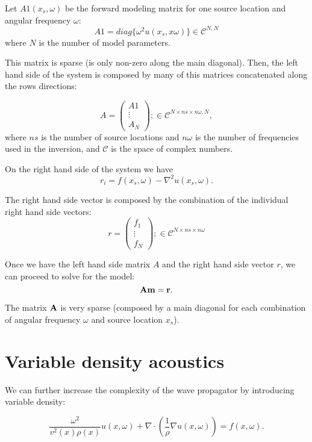 \documentclass[10pt]{article}
\begin{document}
Let $A1(x_s,\omega)$ be the forward
 modeling matrix for one source location and angular frequency $\omega$:
\[
  A1 = diag\{\omega^2 u(x_s,x\omega)\} \in \mathcal{C}^{N,N} 
\]
where $N$ is the number of model parameters.

This matrix is sparse (is only non-zero along the main diagonal).
Then, the left hand side of the system is composed by many of this 
matrices concatenated along the rows directions:

\[
 A = 
 \begin{pmatrix}
  A1     \\
  \vdots  \\
  A_N    
 \end{pmatrix};
\in \mathcal{C}^{N\times ns \times n\omega,N},
\]
where $ns$ is the number of source locations and $n\omega$ is the number
of frequencies used in the inversion, and $\mathcal{C}$ is the space of complex numbers.

On the right hand side of the system we have 
\[
 r_i = f(x_s,\omega) -\nabla^2 u(x_s,\omega).
\]

The right hand side vector is composed by the combination of the individual
right hand side vectors:
\[
 r = 
 \begin{pmatrix}
  f_1     \\
  \vdots  \\
  f_N    
 \end{pmatrix};
\in \mathcal{C}^{N\times ns \times n\omega}
\]

Once we have the left hand side matrix $A$ and the right hand side vector $r$, 
we can proceed to solve for the model:
\begin{equation}
 {\bf A }{\bf m} = \bf r.
\label{eq:linear1}
\end{equation}


The matrix $\bf A$ is very sparse (composed by a main diagonal  for each combination
of angular frequency $\omega$ and source location $x_s$).


\section{Variable density acoustics}

We can further increase the complexity of the wave propagator by introducing variable density: 

\begin{equation}
  \frac{\omega^2 }{v^2(x) \rho(x)} u(x,\omega) +\nabla \cdot(\frac{1}{\rho} \nabla u(x,\omega)) = f(x,\omega).
  \label{eq:vden}
\end{equation}
\end{document}
